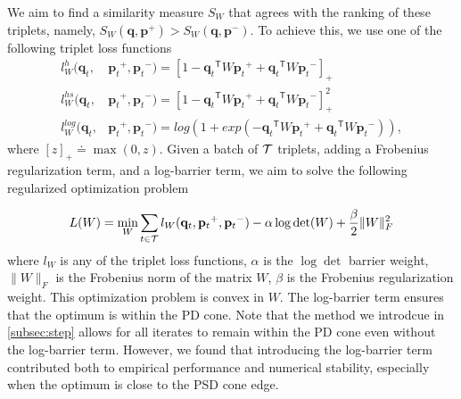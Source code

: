 \documentclass[twoside,11pt]{article}
\newcommand\mat[1]{{#1}}
\renewcommand\vec[1]{\mathbf{#1}}
\newcommand{\T}{{}^\mathsf{T}}
\newcommand{\W}{\mat{W}}
\newcommand{\eqdef}{\doteq}
\newcommand{\frobsq}[1]{{\|#1\|_F^2}}
\newcommand{\frob}[1]{{\|#1\|_F}}
\newcommand{\ignore}[1]{}
\newcommand{\q}{{\vec{q}}}
\newcommand{\p}{{\vec{p}}}
\newcommand{\trip}{{t}}
\newcommand{\qt}{{\q_{\trip}}}
\newcommand{\pt}{{\p_{\trip}}}
\begin{document}
We aim to find a similarity measure $S_{\W}$ that agrees with the ranking of these triplets, namely, $S_{\W}(\q, \p^{+}) > S_{\W}(\q,
\p^{-})$. To achieve this, we use one of the following triplet loss functions
\begin{align}
\label{single-triplet-lossed}
l_{\W}^h(\qt, &\pt^{+}, \pt^{-}) = [1-\qt\T\W\pt^+ + \qt\T\W\pt^-]_{+}
 \\ \nonumber
l_{\W}^{hs}(\qt, &\pt^+, \pt^-) = [1-\qt\T\W\pt^+ + \qt\T\W\pt^-]_{+}^2
 \\ \nonumber
l_{\W}^{log}(\qt, &\pt^+, \pt^-) = log(1+exp(-\qt\T\W\pt^+ + \qt\T\W\pt^-)) \nonumber ,
\end{align}
where $[z]_{+} \eqdef \max(0,z)$. Given a batch of $\cal{T}$ triplets, adding a Frobenius regularization term, and a log-barrier term, we aim to solve the following regularized optimization problem

\begin{equation}
\label{eq-logdet-loss}
L(W) = 
  \min_{\W} \sum_{\trip \in \cal{T}}  l_{\W}(\qt, \pt^+, \pt^-) - \alpha \log \det(\W) + \frac{\beta}{2} \frobsq{\W}
\end{equation}
where $l_{\W}$ is any of the triplet loss functions, $\alpha$ is the $\log\det$ barrier weight, $\frob{\W}$ is the Frobenius norm of the matrix $\W$, $\beta$ is the Frobenius regularization weight. This optimization problem is convex in $\W$.
The log-barrier term ensures that the optimum is within the PD cone. Note that the method we introdcue in \ref{subsec:step} allows for all iterates to remain within the PD cone even without the log-barrier term. However, we found that introducing the log-barrier term contributed both to empirical performance and numerical stability, especially when the optimum is close to the PSD cone edge.


\ignore{
\begin{eqnarray}
  \min_{\W}& \sum_{\trip=1}^{\cal{T}}  l_{\W}(\qt, \pt^+, \pt^-) + \frac{\beta}{2} \frobsq{\W}
 \\  \nonumber
   \rm{s.t.}& \W \succ 0 \quad,
\label{hingelt}
\end{eqnarray}
}


\ignore{
Previous metric learning approaches \citep{OASIS, qianHD, qian}, solved the constrained optimization problem by SGD or stochastic mini-batch gradient steps, while repeatedly projecting back to the convex cone of PD matrices. This projection amounts to solving an eigendecomposition problem and is therefore costly in runtime. An alternative approach is to use a log-barrier term and avoid projecting onto the PD cone \citep{davis2007information,lego}, yielding}
\end{document}
